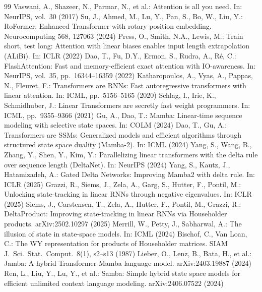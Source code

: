 \documentclass[10pt,a4paper]{article}
\begin{document}
\begin{thebibliography}{99}
\scriptsize
{} Vaswani, A., Shazeer, N., Parmar, N., et al.: Attention is all you need. In: NeurIPS, vol.\ 30 (2017)
 Su, J., Ahmed, M., Lu, Y., Pan, S., Bo, W., Liu, Y.: RoFormer: Enhanced Transformer with rotary position embedding. Neurocomputing 568, 127063 (2024)
 Press, O., Smith, N.A., Lewis, M.: Train short, test long: Attention with linear biases enables input length extrapolation (ALiBi). In: ICLR (2022)
 Dao, T., Fu, D.Y., Ermon, S., Rudra, A., R\'e, C.: FlashAttention: Fast and memory-efficient exact attention with IO-awareness. In: NeurIPS, vol.\ 35, pp.\ 16344--16359 (2022)
 Katharopoulos, A., Vyas, A., Pappas, N., Fleuret, F.: Transformers are RNNs: Fast autoregressive transformers with linear attention. In: ICML, pp.\ 5156--5165 (2020)
 Schlag, I., Irie, K., Schmidhuber, J.: Linear Transformers are secretly fast weight programmers. In: ICML, pp.\ 9355--9366 (2021)
 Gu, A., Dao, T.: Mamba: Linear-time sequence modeling with selective state spaces. In: COLM (2024)
 Dao, T., Gu, A.: Transformers are SSMs: Generalized models and efficient algorithms through structured state space duality (Mamba-2). In: ICML (2024)
 Yang, S., Wang, B., Zhang, Y., Shen, Y., Kim, Y.: Parallelizing linear transformers with the delta rule over sequence length (DeltaNet). In: NeurIPS (2024)
 Yang, S., Kautz, J., Hatamizadeh, A.: Gated Delta Networks: Improving Mamba2 with delta rule. In: ICLR (2025)
 Grazzi, R., Siems, J., Zela, A., Garg, S., Hutter, F., Pontil, M.: Unlocking state-tracking in linear RNNs through negative eigenvalues. In: ICLR (2025)
 Siems, J., Carstensen, T., Zela, A., Hutter, F., Pontil, M., Grazzi, R.: DeltaProduct: Improving state-tracking in linear RNNs via Householder products. arXiv:2502.10297 (2025)
 Merrill, W., Petty, J., Sabharwal, A.: The illusion of state in state-space models. In: ICML (2024)
 Bischof, C., Van Loan, C.: The WY representation for products of Householder matrices. SIAM J.\ Sci.\ Stat.\ Comput.\ 8(1), s2--s13 (1987)
 Lieber, O., Lenz, B., Bata, H., et al.: Jamba: A hybrid Transformer-Mamba language model. arXiv:2403.19887 (2024)
 Ren, L., Liu, Y., Lu, Y., et al.: Samba: Simple hybrid state space models for efficient unlimited context language modeling. arXiv:2406.07522 (2024)

\end{thebibliography}
\end{document}
